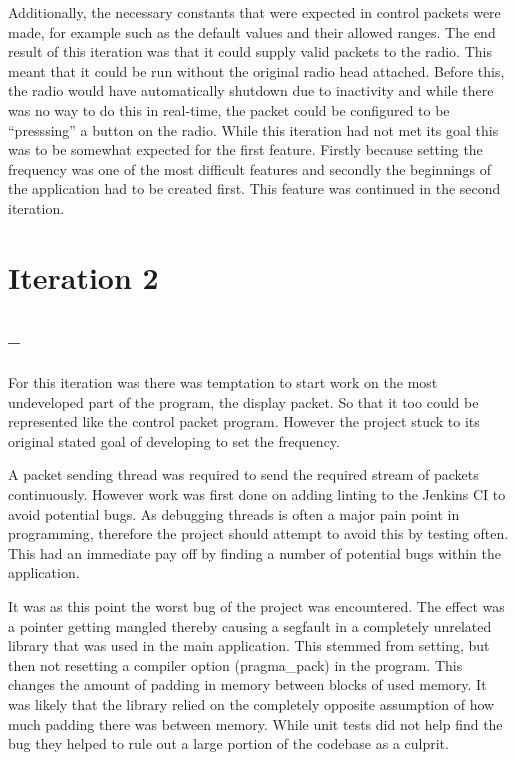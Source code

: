 Additionally, the necessary constants that were expected in control packets were made, for example such as the default values and their allowed ranges. The end result of this iteration was that it could supply valid packets to the radio. This meant that it could be run without the original radio head attached. Before this, the radio would have automatically shutdown due to inactivity and while there was no way to do this in real-time, the packet could be configured to be ``presssing'' a button on the radio. While this iteration had not met its goal this was to be somewhat expected for the first feature. Firstly because setting the frequency was one of the most difficult features and secondly the beginnings of the application had to be created first. This feature was continued in the second iteration.

\section{Iteration 2}
\subsection*{ -- }

For this iteration was there was temptation to start work on the most undeveloped part of the program, the display packet. So that it too could be represented like the control packet program. However the project stuck to its original stated goal of developing to set the frequency.

A packet sending thread was required to send the required stream of packets continuously. However work was first done on adding \gls{linting} to the Jenkins CI to avoid potential bugs. As debugging threads is often a major pain point in programming, therefore the project should attempt to avoid this by testing often. This had an immediate pay off by finding a number of potential bugs within the application.

It was as this point the worst bug of the project was encountered. The effect was a pointer getting mangled thereby causing a segfault in a completely unrelated library that was used in the main application. This stemmed from setting, but then not resetting a compiler option (pragma\_pack) in the program. This changes the amount of padding in memory between blocks of used memory. It was likely that the library relied on the completely opposite assumption of how much padding there was between memory. While unit tests did not help find the bug they helped to rule out a large portion of the codebase as a culprit. 

